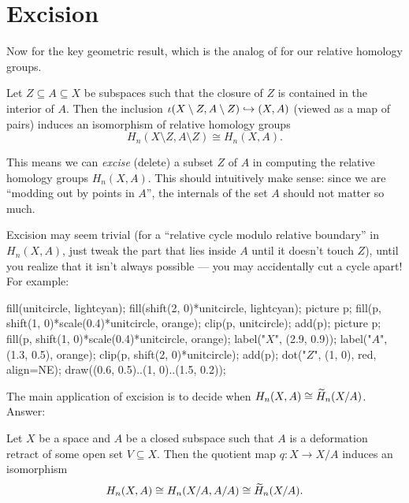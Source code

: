 \section{Excision}
Now for the key geometric result, which is the analog of
 for our relative homology groups.
\begin{theorem}
	[Excision]
	Let $Z \subseteq A \subseteq X$ be subspaces such that
	the closure of $Z$ is contained in the interior of $A$.
	Then the inclusion $\iota (X \setminus Z, A \setminus Z) \hookrightarrow (X,A)$
	(viewed as a map of pairs) induces an isomorphism of
	relative homology groups
	\[ H_n(X \setminus Z, A \setminus Z) \cong H_n(X,A). \]
\end{theorem}
This means we can \emph{excise} (delete) a subset $Z$ of $A$ in computing
the relative homology groups $H_n(X,A)$.
This should intuitively make sense:
since we are ``modding out by points in $A$'',
the internals of the set $A$ should not matter so much.

\begin{example}
	Excision may seem trivial (for a ``relative cycle modulo relative boundary'' in $H_n(X, A)$,
	just tweak the part that
	lies inside $A$ until it doesn't touch $Z$), until you realize that it isn't always possible ---
	you may accidentally cut a cycle apart! For example:
	\begin{center}
	\begin{asy}
		fill(unitcircle, lightcyan);
		fill(shift(2, 0)*unitcircle, lightcyan);
		picture p;
		fill(p, shift(1, 0)*scale(0.4)*unitcircle, orange);
		clip(p, unitcircle);
		add(p);
		picture p;
		fill(p, shift(1, 0)*scale(0.4)*unitcircle, orange);
		label("$X$", (2.9, 0.9));
		label("$A$", (1.3, 0.5), orange);
		clip(p, shift(2, 0)*unitcircle);
		add(p);
		dot("$Z$", (1, 0), red, align=NE);
		draw((0.6, 0.5)..(1, 0)..(1.5, 0.2));
	\end{asy}
	\end{center}
\end{example}

The main application of excision is to decide
when $H_n(X,A) \cong \widetilde H_n(X/A)$.
Answer:

\begin{theorem}
	\label{thm:good_pair}
	Let $X$ be a space and $A$ be a closed subspace such that
	$A$ is a deformation retract of some open set $V \subseteq X$.
	Then the quotient map $q \colon X \to X/A$ induces an isomorphism
	\[ H_n(X,A) \cong H_n(X/A, A/A) \cong \widetilde H_n(X/A). \]
\end{theorem}

